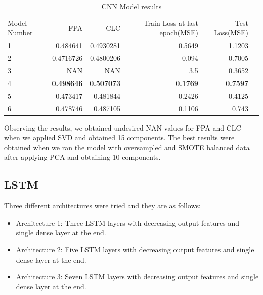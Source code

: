 \begin{table}[!htp]\centering
\caption{CNN Model results}\label{tab: }
\scriptsize
\begin{tabular}{lrrrrr}\toprule
Model Number &FPA &CLC &Train Loss at last epoch(MSE) &Test Loss(MSE) \\
1 &0.484641 &0.4930281 &0.5649 &1.1203 \\\midrule
2 &0.4716726 &0.4800206 &0.094 &0.7005 \\
3 &NAN &NAN &3.5 &0.3652 \\
4 &\textbf{0.498646} &\textbf{0.507073} &\textbf{0.1769} &\textbf{0.7597} \\
5 &0.473417 &0.481844 &0.2426 &0.4125 \\
6 &0.478746 &0.487105 &0.1106 &0.743 \\
\bottomrule
\end{tabular}
\end{table}
 
Observing the results, we obtained undesired NAN values for FPA and CLC when we applied SVD and obtained 15 components. The best results were obtained when we ran the model with oversampled and SMOTE balanced data after applying PCA and obtaining 10 components. 

\subsection{LSTM}

Three different architectures were tried and they are as follows:
 \begin{itemize}
     \item Architecture 1: Three LSTM layers with decreasing output features and single dense layer at the end.
     \item Architecture 2: Five LSTM layers with decreasing output features and single dense layer at the end.
     \item Architecture 3: Seven LSTM layers with decreasing output features and single dense layer at the end.
 \end{itemize}
 
